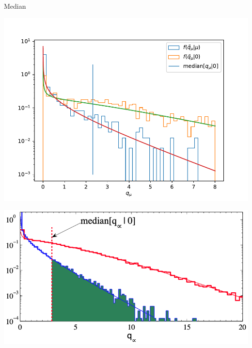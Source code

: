 \documentclass[aspectratio=1610, 9pt]{beamer}
\begin{document}
\begin{frame}{Median}
    \Large
    \centering
    \begin{minipage}{0.49\textwidth}
        \includegraphics[width=\textwidth]{plots/median_plot.pdf}
    \end{minipage}
    \hfill
    \begin{minipage}{0.5\textwidth}
        \includegraphics[width=\textwidth]{imgs/median.png}
    \end{minipage}
\end{frame}
\end{document}
